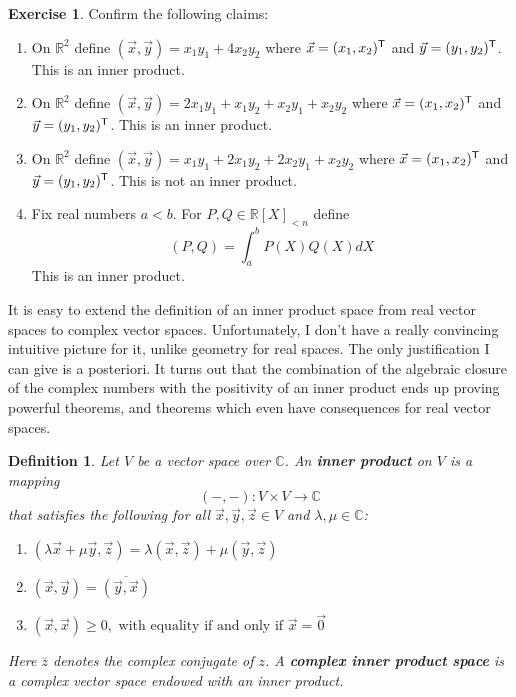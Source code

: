 \documentclass[11pt]{amsbook}
\newtheorem{definition}[theorem]{Definition}
\theoremstyle{definition}
\newtheorem{exercise}{Exercise}
\begin{document}
\begin{exercise} \label{intreal} Confirm the following claims:
\begin{enumerate}
\item On $\mathbb{R}^2$ define $(\vec{x}, \vec{y}) = x_1 y_1 + 4x_2y_2$ where $\vec{x} = (x_1, x_2)^{\sf T}$ and $\vec{y} = (y_1, y_2)^{\sf T}$. This is an inner product.
\item On $\mathbb{R}^2$ define $(\vec{x}, \vec{y}) = 2x_1 y_1 + x_1y_2 + x_2y_1 + x_2y_2$ where $\vec{x} = (x_1, x_2)^{\sf T}$ and $\vec{y} = (y_1, y_2)^{\sf T}$. This is an inner product.
\item On $\mathbb{R}^2$ define $(\vec{x}, \vec{y}) = x_1 y_1 + 2x_1y_2 + 2x_2y_1 + x_2y_2$ where $\vec{x} = (x_1, x_2)^{\sf T}$ and $\vec{y} = (y_1, y_2)^{\sf T}$. This is not an inner product.
\item Fix real numbers $a<b$. For $P, Q \in \mathbb{R}[X]_{< n}$ define $$(P,Q) = \int_a^b P(X)Q(X) dX$$ This is an inner product.
\end{enumerate}
\end{exercise}

It is easy to extend the definition of an inner product space from real vector spaces to complex vector spaces. Unfortunately, I don't have a really convincing intuitive picture for it, unlike geometry for real spaces. The only justification I can give is a posteriori. It turns out that the combination of the algebraic closure of the complex numbers with the positivity of an inner product ends up proving powerful theorems, and theorems which even have consequences for real vector spaces.

\begin{definition}
Let $V$ be a vector space over $\mathbb{C}$. An {\bf inner product} on $V$ is a mapping $$(- , -) : V\times V \to \mathbb{C}$$ that satisfies the following for all $\vec{x}, \vec{y}, \vec{z} \in V$ and $\lambda, \mu \in \mathbb{C}$:
\begin{enumerate}
\item $
(\lambda \vec{x} + \mu \vec{y}, \vec{z}) = \lambda (\vec{x}, \vec{z}) + \mu (\vec{y}, \vec{z}) $
\item $
(\vec{x} , \vec{y} ) = \overline{(\vec{y}, \vec{x})} $
\item $
(\vec{x}, \vec{x}) \geqslant 0, \text{ with equality if and only if } \vec{x} = \vec{0}$
\end{enumerate}
Here $\overline{z}$ denotes the complex conjugate of $z$. A {\bf complex inner product space} is a complex vector space endowed with an inner product.
\end{definition}
\end{document}
